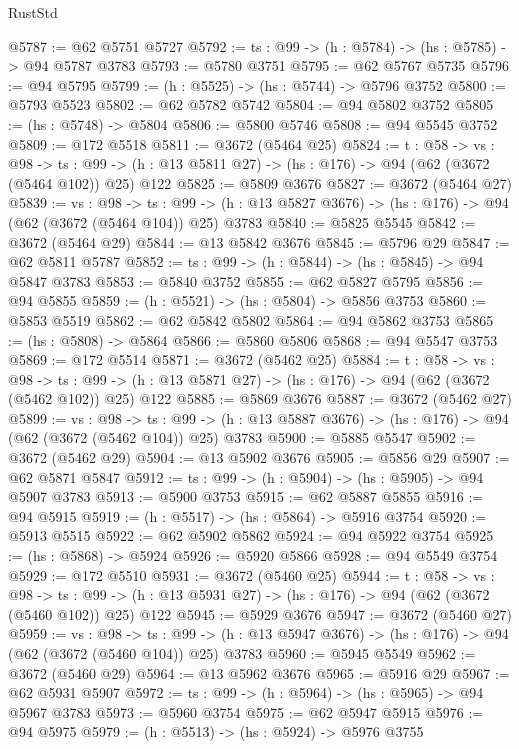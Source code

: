 \begin{lexlean}{RustStd}
\begin{coremodule}
{\begin{coremodule}
{{{{{{{{{{{@5787 := @62 @5751 @5727
@5792 := {ts : @99} -> (h : @5784) -> (hs : @5785) -> @94 @5787 @3783
@5793 := @5780 @3751
@5795 := @62 @5767 @5735
@5796 := @94 @5795
@5799 := (h : @5525) -> (hs : @5744) -> @5796 @3752
@5800 := @5793 @5523
@5802 := @62 @5782 @5742
@5804 := @94 @5802 @3752
@5805 := (hs : @5748) -> @5804
@5806 := @5800 @5746
@5808 := @94 @5545 @3752
@5809 := @172 @5518
@5811 := @3672 (@5464 @25)
@5824 := {t : @58} ->
  {vs : @98} ->
  {ts : @99} -> (h : @13 @5811 @27) -> (hs : @176) -> @94 (@62 (@3672 (@5464 @102)) @25) @122
@5825 := @5809 @3676
@5827 := @3672 (@5464 @27)
@5839 := {vs : @98} ->
  {ts : @99} -> (h : @13 @5827 @3676) -> (hs : @176) -> @94 (@62 (@3672 (@5464 @104)) @25) @3783
@5840 := @5825 @5545
@5842 := @3672 (@5464 @29)
@5844 := @13 @5842 @3676
@5845 := @5796 @29
@5847 := @62 @5811 @5787
@5852 := {ts : @99} -> (h : @5844) -> (hs : @5845) -> @94 @5847 @3783
@5853 := @5840 @3752
@5855 := @62 @5827 @5795
@5856 := @94 @5855
@5859 := (h : @5521) -> (hs : @5804) -> @5856 @3753
@5860 := @5853 @5519
@5862 := @62 @5842 @5802
@5864 := @94 @5862 @3753
@5865 := (hs : @5808) -> @5864
@5866 := @5860 @5806
@5868 := @94 @5547 @3753
@5869 := @172 @5514
@5871 := @3672 (@5462 @25)
@5884 := {t : @58} ->
  {vs : @98} ->
  {ts : @99} -> (h : @13 @5871 @27) -> (hs : @176) -> @94 (@62 (@3672 (@5462 @102)) @25) @122
@5885 := @5869 @3676
@5887 := @3672 (@5462 @27)
@5899 := {vs : @98} ->
  {ts : @99} -> (h : @13 @5887 @3676) -> (hs : @176) -> @94 (@62 (@3672 (@5462 @104)) @25) @3783
@5900 := @5885 @5547
@5902 := @3672 (@5462 @29)
@5904 := @13 @5902 @3676
@5905 := @5856 @29
@5907 := @62 @5871 @5847
@5912 := {ts : @99} -> (h : @5904) -> (hs : @5905) -> @94 @5907 @3783
@5913 := @5900 @3753
@5915 := @62 @5887 @5855
@5916 := @94 @5915
@5919 := (h : @5517) -> (hs : @5864) -> @5916 @3754
@5920 := @5913 @5515
@5922 := @62 @5902 @5862
@5924 := @94 @5922 @3754
@5925 := (hs : @5868) -> @5924
@5926 := @5920 @5866
@5928 := @94 @5549 @3754
@5929 := @172 @5510
@5931 := @3672 (@5460 @25)
@5944 := {t : @58} ->
  {vs : @98} ->
  {ts : @99} -> (h : @13 @5931 @27) -> (hs : @176) -> @94 (@62 (@3672 (@5460 @102)) @25) @122
@5945 := @5929 @3676
@5947 := @3672 (@5460 @27)
@5959 := {vs : @98} ->
  {ts : @99} -> (h : @13 @5947 @3676) -> (hs : @176) -> @94 (@62 (@3672 (@5460 @104)) @25) @3783
@5960 := @5945 @5549
@5962 := @3672 (@5460 @29)
@5964 := @13 @5962 @3676
@5965 := @5916 @29
@5967 := @62 @5931 @5907
@5972 := {ts : @99} -> (h : @5964) -> (hs : @5965) -> @94 @5967 @3783
@5973 := @5960 @3754
@5975 := @62 @5947 @5915
@5976 := @94 @5975
@5979 := (h : @5513) -> (hs : @5924) -> @5976 @3755
}}}}}}}}}}}
\end{coremodule}}
\end{coremodule}
\end{lexlean}
